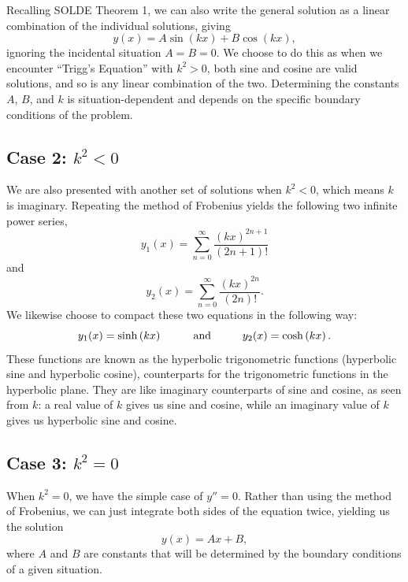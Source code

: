 \documentclass[11pt]{report}
\newcommand{\fpar}[1]{\left({#1}\right)}
\begin{document}
Recalling SOLDE Theorem 1, we can also write the general solution as a linear combination of the individual solutions, giving
    \begin{equation}
        y(x)=A\sin{(kx)}+B\cos{(kx)},
    \end{equation}
ignoring the incidental situation $A=B=0$. We choose to do this as when we encounter ``Trigg's Equation'' with $k^2>0$, both sine and cosine are valid solutions, and so is any linear combination of the two. Determining the constants $A$, $B$, and $k$ is situation-dependent and depends on the specific boundary conditions of the problem.

\subsection*{Case 2: $k^2<0$}
We are also presented with another set of solutions when $k^2<0$, which means $k$ is imaginary. Repeating the method of Frobenius yields the following two infinite power series,
    \begin{equation*}
        y_1(x) = \sum_{n=0}^\infty\frac{\fpar{kx}^{2n+1}}{\fpar{2n+1}!}
    \end{equation*}
and
    \begin{equation*}
        y_2(x) = \sum_{n=0}^\infty\frac{\fpar{kx}^{2n}}{\fpar{2n}!}.
    \end{equation*}
We likewise choose to compact these two equations in the following way:
 \begin{equation}
        y_1(x) = \sinh\fpar{kx} \text{\hspace{1cm}and\hspace{1cm}} y_2(x) = \cosh\fpar{kx}.
    \end{equation}
These functions are known as the hyperbolic trigonometric functions (hyperbolic sine and hyperbolic cosine), counterparts for the trigonometric functions in the hyperbolic plane. They are like imaginary counterparts of sine and cosine, as seen from $k$: a real value of $k$ gives us sine and cosine, while an imaginary value of $k$ gives us hyperbolic sine and cosine.

\subsection*{Case 3: $k^2=0$}
When $k^2=0$, we have the simple case of $y''=0$. Rather than using the method of Frobenius, we can just integrate both sides of the equation twice, yielding us the solution
    \begin{equation}
        y(x) = Ax + B,
    \end{equation}
where $A$ and $B$ are constants that will be determined by the boundary conditions of a given situation.
\end{document}
